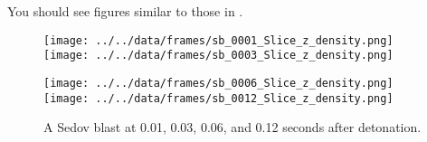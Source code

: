 You should see figures similar to those in .

\begin{figure}[h]
\texttt{[image: ../../data/frames/sb\_0001\_Slice\_z\_density.png]}
\texttt{[image: ../../data/frames/sb\_0003\_Slice\_z\_density.png]}

\texttt{[image: ../../data/frames/sb\_0006\_Slice\_z\_density.png]}
\texttt{[image: ../../data/frames/sb\_0012\_Slice\_z\_density.png]}
\caption{A Sedov blast at 0.01, 0.03, 0.06, and 0.12 seconds after detonation.}
\label{sedov-blast}
\end{figure}
